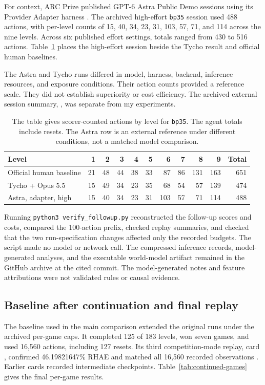 For context, ARC Prize published GPT-6 Astra Public Demo sessions using its Provider Adapter harness \citep{arc2026astra}. The archived high-effort \texttt{bp35} session used 488 actions, with per-level counts of 15, 40, 34, 23, 31, 103, 57, 71, and 114 across the nine levels. Across six published effort settings, totals ranged from 430 to 516 actions. Table~\ref{tab:bp35-levels} places the high-effort session beside the Tycho result and official human baselines.

The Astra and Tycho runs differed in model, harness, backend, inference resources, and exposure conditions. Their action counts provided a reference scale. They did not establish superiority or cost efficiency. The archived external session summary, , was separate from my experiments.

\begin{table}[H]
\centering\small
\begin{tabular}{@{}lrrrrrrrrrr@{}}\toprule
Level & 1 & 2 & 3 & 4 & 5 & 6 & 7 & 8 & 9 & Total\\\midrule
Official human baseline & 21 & 48 & 44 & 38 & 33 & 87 & 86 & 131 & 163 & 651\\
Tycho + Opus 5.5 & 15 & 49 & 34 & 23 & 35 & 68 & 54 & 57 & 139 & 474\\
Astra, adapter, high & 15 & 40 & 34 & 23 & 31 & 103 & 57 & 71 & 114 & 488\\\bottomrule
\end{tabular}
\caption{The table gives scorer-counted actions by level for \texttt{bp35}. The agent totals include resets. The Astra row is an external reference under different conditions, not a matched model comparison.}\label{tab:bp35-levels}
\end{table}

Running \texttt{python3 verify\_followup.py} reconstructed the follow-up scores and costs, compared the 100-action prefix, checked replay summaries, and checked that the two run-specification changes affected only the recorded budgets. The script made no model or network call. The compressed inference records, model-generated analyses, and the executable world-model artifact remained in the GitHub archive at the cited commit. The model-generated notes and feature attributions were not validated rules or causal evidence.



\subsection{Baseline after continuation and final replay}\label{app:continued-audit}
The baseline used in the main comparison extended the original runs under the archived per-game caps. It completed 125 of 183 levels, won seven games, and used 16,560 actions, including 127 resets. Its third competition-mode replay, card , confirmed 46.19821647\% RHAE and matched all 16,560 recorded observations \citep{dai2026baselinefinalcard}. Earlier cards recorded intermediate checkpoints. Table~\ref{tab:continued-games} gives the final per-game results.

